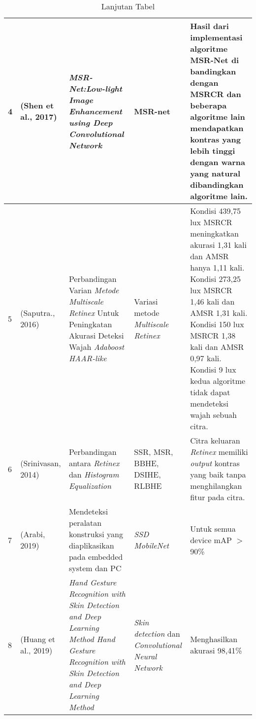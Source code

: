 \begin{table}[htpb]
	\caption{Lanjutan Tabel}
	\label{labelku}
	\vspace{0cm}
	\begin{tabular}{|p{0.5cm}|p{2cm}|p{3cm}|p{3cm}|p{4cm}|}
		\hline
		4 & (Shen et al., 2017) & \emph{MSR-Net:Low-light Image Enhancement using Deep Convolutional Network} & MSR-net & Hasil dari implementasi algoritme MSR-Net di bandingkan dengan MSRCR dan beberapa algoritme lain mendapatkan kontras yang lebih tinggi dengan warna yang natural dibandingkan algoritme lain.\\
		\hline
		5 & (Saputra., 2016) & Perbandingan Varian \emph{Metode Multiscale Retinex} Untuk Peningkatan Akurasi Deteksi Wajah \emph{Adaboost HAAR-like} & Variasi metode \emph{Multiscale Retinex} & Kondisi 439,75 lux MSRCR meningkatkan akurasi 1,31 kali dan
		AMSR hanya 1,11 kali.
		Kondisi 273,25 lux MSRCR 1,46 kali dan AMSR 1,31 kali.
		Kondisi 150 lux 
		MSRCR 1,38 kali dan AMSR 0,97 kali. 
		Kondisi 9 lux kedua algoritme tidak dapat mendeteksi wajah sebuah citra.\\
		\hline	
		
		6 & (Srinivasan, 2014) & Perbandingan antara \emph{Retinex} dan \emph{Histogram Equalization} & SSR, MSR, BBHE, DSIHE, RLBHE & Citra keluaran \emph{Retinex} memiliki \emph{output} kontras yang baik tanpa menghilangkan fitur pada citra. \\
		\hline	
		7 & (Arabi, 2019) & Mendeteksi peralatan konstruksi yang diaplikasikan pada embedded system dan PC & \emph{SSD MobileNet} & Untuk semua device mAP $>$ 90\% \\
		\hline
		8& (Huang et al., 2019) &\emph{Hand Gesture Recognition with Skin Detection and Deep Learning Method Hand Gesture Recognition with Skin Detection and Deep Learning Method}& \emph{Skin detection} dan \emph{Convolutional Neural Network} & Menghasilkan akurasi 98,41\% \\
		\hline
	\end{tabular}
\end{table}
